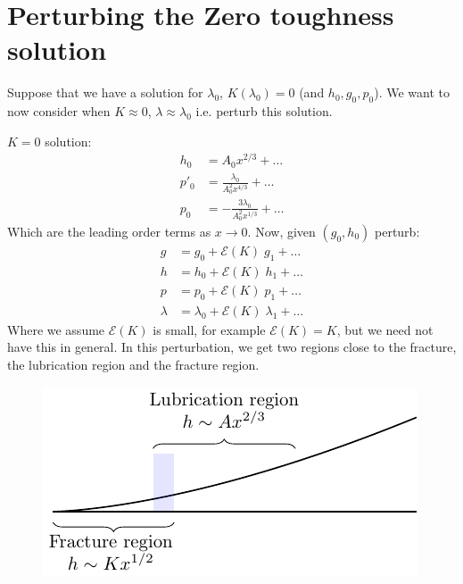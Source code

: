 \documentclass{article}
\begin{document}
\section{Perturbing the Zero toughness solution}
Suppose that we have a solution for $\lambda_0$, $K(\lambda_0)=0$
(and $h_0,g_0,p_0$). We want to now consider when $K\approx0$, 
$\lambda \approx \lambda_0$ i.e. perturb this solution.

$K=0$ solution:
\begin{align*}
h_0 &= A_0x^{2/3}+ \dots \\
p'_0 &= \frac{\lambda_0}{A_0^2x^{4/3}}+ \dots \\
p_0 &= -\frac{3\lambda_0}{A_0^2x^{1/3}}+ \dots 
\end{align*}
Which are the leading order terms as $x\to0$.
Now, given $(g_0,h_0)$ perturb:
\begin{align*}
g &= g_0 + \mathcal{E}(K) \; g_1 + \dots \\
h &= h_0 + \mathcal{E}(K) \; h_1 + \dots \\
p &= p_0 + \mathcal{E}(K) \; p_1 + \dots \\
\lambda &= \lambda_0 + \mathcal{E}(K) \; \lambda_1 + \dots 
\end{align*}
Where we assume $\mathcal{E}(K)$ is small, for example 
$\mathcal{E}(K) = K$, but we need not have this in general.
In this perturbation, we get two regions close to the fracture, 
the lubrication region and the fracture region. 
\begin{figure}[!ht]\centering
\includegraphics{Fig6.pdf}
\end{figure}
\end{document}
